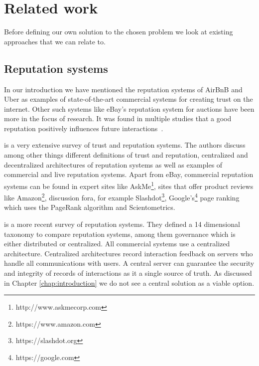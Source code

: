 \section{Related work}
Before defining our own solution to the chosen problem we look at existing approaches that we can 
relate to. 

\subsection{Reputation systems}
In our introduction we have mentioned the reputation systems of AirBnB and Uber as examples of 
state-of-the-art commercial systems for creating trust on the internet. Other such systems like 
eBay's reputation system for auctions have been more in the focus of research. It was found in 
multiple studies that a good reputation positively influences future interactions~\cite{resnick2002trust, houser2006reputation, dewan2004adverse}.

\cite{josang2007survey} is a very extensive survey of trust and reputation systems. The authors 
discuss among other things different definitions of trust and reputation, centralized and decentralized architectures 
of reputation systems as well as examples of commercial and live reputation systems. Apart from 
eBay, commercial reputation systems can be found in expert sites like AskMe\footnote{http://www.askmecorp.com},
sites that offer product reviews like Amazon\footnote{https://www.amazon.com}, discussion fora, 
for example Slashdot\footnote{https://slashdot.org}, Google's\footnote{https://google.com} page ranking which uses the PageRank
algorithm\cite{page1999pagerank} and Scientometrics. 

\cite{HENDRIKX2015184} is a more recent survey of reputation systems. They defined a 14 dimensional
taxonomy to compare reputation systems, among them governance which is either distributed or 
centralized. All commercial systems use a centralized
architecture. Centralized architectures record interaction feedback on servers who handle all 
communications with users. A central server can guarantee the security and integrity of records of
interactions as it a single source of truth. As discussed in Chapter \ref{chap:introduction} we do
not see a central solution as a viable option. 

